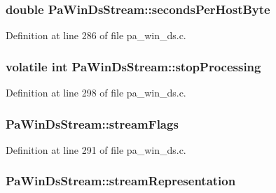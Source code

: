 \subsubsection[{\texorpdfstring{seconds\+Per\+Host\+Byte}{secondsPerHostByte}}]{\setlength{\rightskip}{0pt plus 5cm}double Pa\+Win\+Ds\+Stream\+::seconds\+Per\+Host\+Byte}\hypertarget{struct_pa_win_ds_stream_ac20b4f0eb3b030a77bc69efabb4606f9}{}\label{struct_pa_win_ds_stream_ac20b4f0eb3b030a77bc69efabb4606f9}


Definition at line 286 of file pa\+\_\+win\+\_\+ds.\+c.

\subsubsection[{\texorpdfstring{stop\+Processing}{stopProcessing}}]{\setlength{\rightskip}{0pt plus 5cm}volatile {\bf int} Pa\+Win\+Ds\+Stream\+::stop\+Processing}\hypertarget{struct_pa_win_ds_stream_a2db908a00a53e01a061721751954f4eb}{}\label{struct_pa_win_ds_stream_a2db908a00a53e01a061721751954f4eb}


Definition at line 298 of file pa\+\_\+win\+\_\+ds.\+c.

\subsubsection[{\texorpdfstring{stream\+Flags}{streamFlags}}]{ Pa\+Win\+Ds\+Stream\+::stream\+Flags}\hypertarget{struct_pa_win_ds_stream_a902670e483a6f6989e1ac84c11b2bd5d}{}\label{struct_pa_win_ds_stream_a902670e483a6f6989e1ac84c11b2bd5d}


Definition at line 291 of file pa\+\_\+win\+\_\+ds.\+c.

\subsubsection[{\texorpdfstring{stream\+Representation}{streamRepresentation}}]{ Pa\+Win\+Ds\+Stream\+::stream\+Representation}\hypertarget{struct_pa_win_ds_stream_a83364a8bef2314f9122dc397155d614a}{}\label{struct_pa_win_ds_stream_a83364a8bef2314f9122dc397155d614a}


